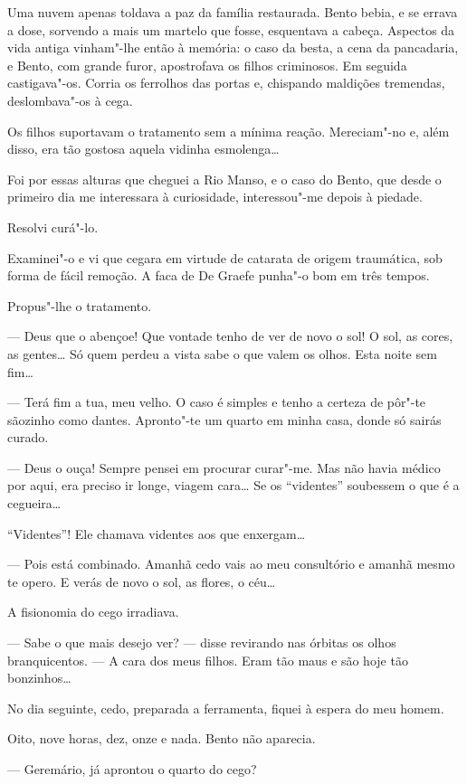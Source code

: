 Uma nuvem apenas toldava a paz da família restaurada. Bento bebia, e se
errava a dose, sorvendo a mais um martelo que fosse, esquentava a
cabeça. Aspectos da vida antiga vinham"-lhe então à memória: o caso da
besta, a cena da pancadaria, e Bento, com grande furor, apostrofava os
filhos criminosos. Em seguida castigava"-os. Corria os ferrolhos das
portas e, chispando maldições tremendas, deslombava"-os à cega.

Os filhos suportavam o tratamento sem a mínima reação. Mereciam"-no e,
além disso, era tão gostosa aquela vidinha esmolenga\ldots{}

Foi por essas alturas que cheguei a Rio Manso, e o caso do Bento, que
desde o primeiro dia me interessara à curiosidade, interessou"-me depois
à piedade.

Resolvi curá"-lo.

Examinei"-o e vi que cegara em virtude de catarata de origem traumática,
sob forma de fácil remoção. A faca de De Graefe punha"-o bom em três
tempos.

Propus"-lhe o tratamento.

--- Deus que o abençoe! Que vontade tenho de ver de novo o sol! O sol,
as cores, as gentes\ldots{} Só quem perdeu a vista sabe o que valem os olhos.
Esta noite sem fim\ldots{}

--- Terá fim a tua, meu velho. O caso é simples e tenho a certeza de
pôr"-te sãozinho como dantes. Apronto"-te um quarto em minha casa, donde
só sairás curado.

--- Deus o ouça! Sempre pensei em procurar curar"-me. Mas não havia
médico por aqui, era preciso ir longe, viagem cara\ldots{} Se os ``videntes''
soubessem o que é a cegueira\ldots{}

``Videntes''! Ele chamava videntes aos que enxergam\ldots{}

--- Pois está combinado. Amanhã cedo vais ao meu consultório e amanhã
mesmo te opero. E verás de novo o sol, as flores, o céu\ldots{}

A fisionomia do cego irradiava.

--- Sabe o que mais desejo ver? --- disse revirando nas órbitas os olhos
branquicentos. --- A cara dos meus filhos. Eram tão maus e são hoje tão
bonzinhos\ldots{}

No dia seguinte, cedo, preparada a ferramenta, fiquei à espera do meu
homem.

Oito, nove horas, dez, onze e nada. Bento não aparecia.

--- Geremário, já aprontou o quarto do cego?

